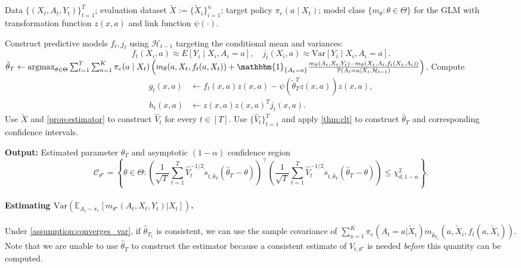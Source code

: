 \documentclass[11pt]{article}
\newcommand{\E}{\mathbb{E}}
\newcommand{\Var}{\mathrm{Var}}
\DeclareMathOperator*{\argmax}{argmax}
\begin{document}
\begin{algorithm}[H] 
\caption{Construction of Confidence Intervals for GLMs Under Adaptive Sampling}
\begin{algorithmic}[1]
\Require Data $\{(X_t, A_t, Y_t)\}_{t=1}^T$; evaluation dataset $\tilde{X} := \{\tilde{X}_{i}\}_{i=1}^{n}$; target policy $\pi_e(a \mid X_t)$; model class $\{m_\theta : \theta \in \Theta\}$ for the GLM with transformation function $z(x,a)$ and link function $\psi(\cdot)$.

    \State Construct predictive models $f_t, j_t$ using $\mathcal{H}_{t-1}$ targeting the conditional mean and variances:
    \[
        f_t(X_i,a) \approx E[Y_i \mid X_i, A_i = a], \quad j_t(X_i,a) \approx \text{Var}[Y_{i} \mid X_i, A_i = a].
    \]
\EndFor
\State $\tilde{\theta}_{T} \leftarrow \argmax_{\theta \in \Theta}  \sum_{t=1}^{T} \sum_{a=1}^{K} \pi_{e}(a \mid X_{t}) \left( m_{\theta}(a,X_{t},f_{t}(a,X_{t}))   + \mathbbm{1}_{\{A_{t} = a\}} \frac{ m_{\theta}(A_{t},X_{t},Y_{t})  -  m_{\theta}(X_{t},A_{t},f_{t}(X_{t},A_{t})) }{ \mathbb{P}(A_{t} =a \mid X_{t},\mathcal{H}_{t-1})  }\right)$.
\State Compute 
\begin{align*}
    g_{t}(x,a) &\leftarrow f_{t}(x,a)z(x,a) - \psi(\tilde{\theta}^{T}_ {T}z(x,a))z(x,a),\\
   h_{t}(x,a) &\leftarrow z(x,a)z(x,a)^{T}j_t(x,a)  .
\end{align*}
\State Use $\tilde{X}$ and \cref{prop:estimator} to construct $\hat{V}_{t}$ for every $t \in [T]$. 
\State Use $\{\hat{V}_{t}\}_{t=1}^{T}$ and apply \cref{thm:clt} to construct $\hat{\theta}_{T}$ and corresponding confidence intervals. 

\State \textbf{Output:} Estimated parameter $\hat{\theta}_{T}$ and asymptotic $(1-\alpha)$ confidence region
\[
    \mathcal{C}_{\theta^{\star}} = \left\{ \theta \in \Theta : 
    \left(\frac{1}{\sqrt{T}} \sum_{t=1}^{T}\hat{V}_{t}^{-1/2} \dot{s}_{t,\hat{\theta}_{T}} (\hat{\theta}_{T}- \theta ) \right)^{\!\top}
    \left(\frac{1}{\sqrt{T}} \sum_{t=1}^{T}\hat{V}_{t}^{-1/2} \dot{s}_{t,\hat{\theta}_{T}} (\hat{\theta}_{T}- \theta ) \right)
    \le  \chi^{2}_{d,1-\alpha} \right\}.
\]
\end{algorithmic}\label{alg:glm_confint}
\end{algorithm}

\iffalse 


\paragraph{Estimating $\Var \left( \E_{A_{t} \sim \pi_{e}}  \left[m_{\theta^{\star}}(A_{t},X_{t},Y_{t}) | X_{t}\right] \right)$.}
Under \cref{assumption:converges_var}, if $\hat{\theta}_{T}_{1}$ is consistent, we can use the sample covariance of $\sum_{a=1}^{K} \pi_{e}(A_{t} = a | \tilde{X}_{i} ) m_{\hat{\theta}_{T}_{1}}(a,\tilde{X}_{i},f_{t}(a,\tilde{X}_{i}))$. Note that we are unable to use $\hat{\theta}_{T}$ to construct the estimator because a consistent estimate of $V_{t, \theta^{\star}}$ is needed \emph{before} this quantity can be computed. 
\end{document}
